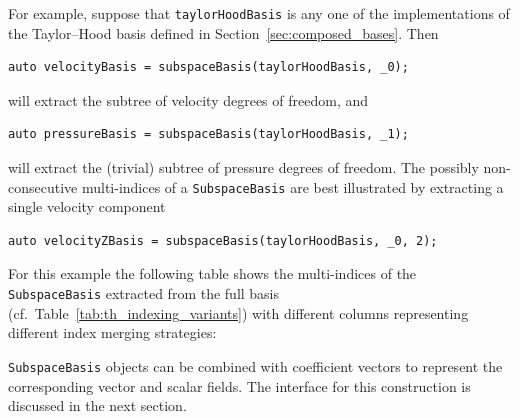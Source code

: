 \documentclass[a4paper,10pt,headings=normal,bibliography=totoc]{scrartcl}
\newcommand{\cpp}[1]{\lstinline[basicstyle=\ttfamily]!#1!}
\begin{document}
For example, suppose that \cpp{taylorHoodBasis} is any one of the implementations
of the Taylor--Hood basis defined in Section~\ref{sec:composed_bases}.
Then
\begin{lstlisting}[style=Example]
auto velocityBasis = subspaceBasis(taylorHoodBasis, _0);
\end{lstlisting}
will extract the subtree of velocity degrees of freedom, and
\begin{lstlisting}[style=Example]
auto pressureBasis = subspaceBasis(taylorHoodBasis, _1);
\end{lstlisting}
will extract the (trivial) subtree of pressure degrees of freedom.
The possibly non-consecutive multi-indices of a \cpp{SubspaceBasis} are
best illustrated by extracting a single velocity component
\begin{lstlisting}[style=Example]
auto velocityZBasis = subspaceBasis(taylorHoodBasis, _0, 2);
\end{lstlisting}
For this example the following table shows the multi-indices
of the \cpp{SubspaceBasis} extracted from the full basis
(cf.\ Table~\ref{tab:th_indexing_variants})
with different columns representing different index merging strategies:

\noindent
{}


\cpp{SubspaceBasis} objects can be combined with
coefficient vectors to represent the corresponding vector and scalar fields.
The interface for this construction is discussed in the next section.
\end{document}
